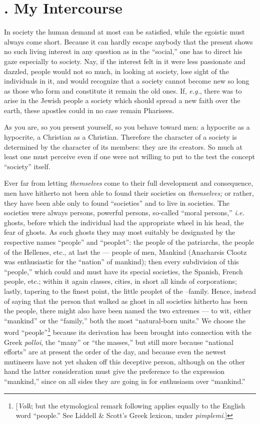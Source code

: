 \section[2. My Intercourse]{. My Intercourse}

In society the human demand at most can be satisfied, while the egoistic must 
always come short. Because it can hardly escape anybody that the present shows 
no such living interest in any question as in the ``social,'' one has to 
direct his gaze especially to society. Nay, if the interest felt in it were 
less passionate and dazzled, people would not so much, in looking at society, 
lose sight of the individuals in it, and would recognize that a society cannot 
become new so long as those who form and constitute it remain the old ones. 
If, \textit{e.g.}, there was to arise in the Jewish people a society which 
should spread a new faith over the earth, these apostles could in no case 
remain Pharisees.

As you are, so you present yourself, so you behave toward men: a hypocrite as 
a hypocrite, a Christian as a Christian. Therefore the character of a society 
is determined by the character of its members: they are its creators. So much 
at least one must perceive even if one were not willing to put to the test the 
concept ``society'' itself.

Ever far from letting \textit{themselves} come to their full development and 
consequence, men have hitherto not been able to found their societies on 
\textit{themselves;} or rather, they have been able only to found 
``societies'' and to live in societies. The societies were always persons, 
powerful persons, so-called ``moral persons,'' \textit{i.e.} ghosts, before 
which the individual had the appropriate wheel in his head, the fear of 
ghosts. As such ghosts they may most suitably be designated by the respective 
names ``people'' and ``peoplet'': the people of the patriarchs, the people 
of the Hellenes, etc., at last the --- people of men, Mankind (Anacharsis 
Clootz was enthusiastic for the ``nation'' of mankind); then every 
subdivision of this ``people,'' which could and must have its special 
societies, the Spanish, French people, etc.; within it again classes, cities, 
in short all kinds of corporations; lastly, tapering to the finest point, the 
little peoplet of the --family. Hence, instead of saying that the person that 
walked as ghost in all societies hitherto has been the people, there might 
also have been named the two extremes --- to wit, either ``mankind'' or the 
``family,'' both the most ``natural-born units.'' We choose the word 
``people''\footnote{[\textit{Volk}; but the etymological remark following 
applies equally to the English word ``people.'' See Liddell \& Scott's Greek 
lexicon, under \textit{pimplemi}.]} because its derivation has been brought 
into connection with the Greek \textit{polloi}, the ``many'' or ``the 
masses,'' but still more because ``national efforts'' are at present the 
order of the day, and because even the newest mutineers have not yet shaken 
off this deceptive person, although on the other hand the latter consideration 
must give the preference to the expression ``mankind,'' since on all sides 
they are going in for enthusiasm over ``mankind.''

